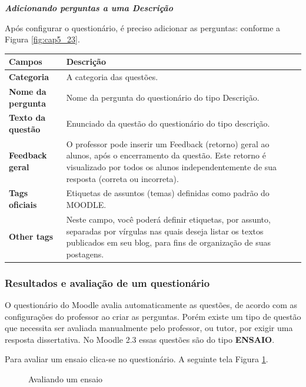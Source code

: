  \textit{\textbf{Adicionando perguntas a uma Descrição}}

Após configurar o questionário, é preciso adicionar as perguntas: conforme a Figura \ref{fig:cap5_23}.

\begin{longtable}{p{6cm}|p{9cm}}
     \hline
     \rowcolor[rgb]{0.8,0.8,0.8} \textbf{Campos} &  \textbf{Descrição}\\\hline
    \textbf{Categoria} & A categoria das questões. \\\hline
    \textbf{Nome da pergunta} & Nome da pergunta do questionário do tipo Descrição.\\\hline
    \textbf{Texto da questão} &Enunciado da questão do questionário do tipo descrição.\\\hline
    \textbf{Feedback geral} &O professor  pode inserir um  Feedback (retorno)  geral  ao alunos,  após o encerramento da questão. Este retorno é visualizado por todos os alunos independentemente de sua resposta (correta ou incorreta). \\\hline
    \textbf{Tags oficiais} & Etiquetas de assuntos (temas) definidas como padrão do MOODLE. \\\hline
    \textbf{Other tags} &  Neste campo,  você poderá definir  etiquetas,  por assunto, separadas por vírgulas nas quais deseja listar os textos publicados em seu blog, para fins de organização de suas postagens. \\\hline
\end{longtable}%

\subsubsection{Resultados e avaliação de um questionário}

O questionário do Moodle avalia automaticamente as questões, de acordo com as configurações do professor ao criar as perguntas. Porém existe um tipo de questão que necessita ser avaliada manualmente pelo professor, ou tutor, por exigir uma resposta dissertativa. No Moodle 2.3 essas questões são do tipo \textbf{ENSAIO}.

Para avaliar um ensaio clica-se no questionário. A seguinte tela Figura \ref{fig:cap5_24}.

\begin{figure}[htbp]
 \begin{center}
  \caption{Avaliando um ensaio}
  \label{fig:cap5_24}
 \end{center}
\end{figure}

